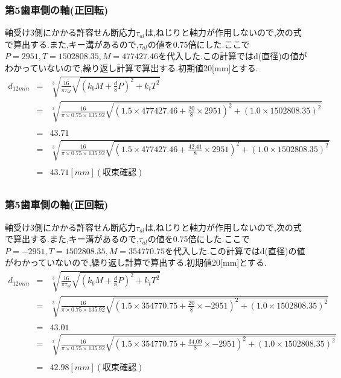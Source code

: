 \documentclass[a4j,twoside,openright,11pt]{jreport}
\begin{document}
\subsubsection{第5歯車側の軸(正回転)}
軸受け3側にかかる許容せん断応力$\tau_{al}$は,ねじりと軸力が作用しないので,次の式で算出する.また,キー溝があるので,$\tau_{al}$の値を0.75倍にした.ここで$P=2951,T=1502808.35, M=477427.46$を代入した.この計算ではd(直径)の値がわかっていないので,繰り返し計算で算出する.初期値20[mm]とする.
\begin{eqnarray}
d_{12min}&=& \sqrt [3]{ \frac{16}{\pi \tau_{al}}\sqrt{(k_bM+\frac{d}{8}P)^2+k_tT^2} }\\
       &=& \sqrt [3]{ \frac{16}{\pi \times 0.75 \times 135.92} \sqrt{(1.5 \times 477427.46 +\frac{20}{8}\times 2951)^2+(1.0 \times 1502808.35)^2} }\nonumber\\
\\
       &=&43.71\\
       &=& \sqrt [3]{ \frac{16}{\pi \times 0.75 \times 135.92} \sqrt{(1.5 \times 477427.46 +\frac{42.41}{8}\times 2951)^2+(1.0 \times 1502808.35)^2} }\nonumber\\
\\
       &=& 43.71[mm](収束確認)\\
\end{eqnarray}
\subsubsection{第5歯車側の軸(正回転)}
軸受け3側にかかる許容せん断応力$\tau_{al}$は,ねじりと軸力が作用しないので,次の式で算出する.また,キー溝があるので,$\tau_{al}$の値を0.75倍にした.ここで$P=-2951,T=1502808.35,M=354770.75$を代入した.この計算ではd(直径)の値がわかっていないので,繰り返し計算で算出する.初期値20[mm]とする.
\begin{eqnarray}
d_{12min}&=& \sqrt [3]{ \frac{16}{\pi \tau_{al}}\sqrt{(k_bM+\frac{d}{8}P)^2+k_tT^2} }\\
       &=& \sqrt [3]{ \frac{16}{\pi \times 0.75 \times 135.92} \sqrt{(1.5 \times 354770.75 +\frac{20}{8}\times -2951)^2+(1.0 \times 1502808.35)^2} }\nonumber\\
\\
       &=& 43.01\\
       &=& \sqrt [3]{ \frac{16}{\pi \times 0.75 \times 135.92} \sqrt{(1.5 \times 354770.75 +\frac{34.09}{8}\times -2951)^2+(1.0 \times 1502808.35)^2} }\nonumber\\
\\
         &=& 42.98[mm](収束確認)
\end{eqnarray}
\end{document}
